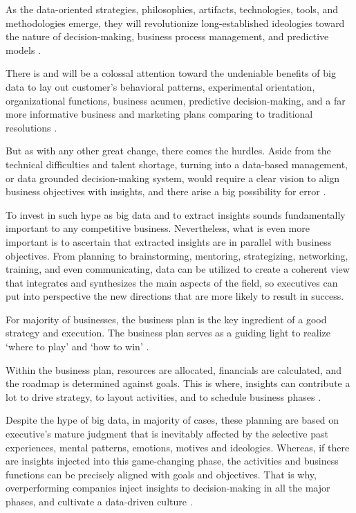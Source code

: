 As the data-oriented strategies, philosophies, artifacts, technologies, tools, and methodologies emerge, they will revolutionize long-established ideologies toward the nature of decision-making, business process management, and predictive models \cite{Popovic2018}.

There is and will be a colossal attention toward the undeniable benefits of big data to lay out customer’s behavioral patterns, experimental orientation, organizational functions, business acumen, predictive decision-making, and a far more informative business and marketing plans comparing to traditional resolutions \cite{Driest2016}.

But as with any other great change, there comes the hurdles. Aside from the technical difficulties and talent shortage, turning into a data-based management, or data grounded decision-making system, would require a clear vision to align business objectives with insights, and there arise a big possibility for error \cite{Ranjan2019}.

To invest in such hype as big data and to extract insights sounds fundamentally important to any competitive business. Nevertheless, what is even more important is to ascertain that extracted insights are in parallel with business objectives. From planning to brainstorming, mentoring, strategizing, networking, training, and even communicating, data can be utilized to create a coherent view that integrates and synthesizes the main aspects of the field, so executives can put into perspective the new directions that are more likely to result in success.

For majority of businesses, the business plan is the key ingredient of a good strategy and execution. The business plan serves as a guiding light to realize ‘where to play’ and ‘how to win’ \cite{Driest2016}.

Within the business plan, resources are allocated, financials are calculated, and the roadmap is determined against goals. This is where, insights can contribute a lot to drive strategy, to layout activities, and to schedule business phases \cite{Chen2018a}.

Despite the hype of big data, in majority of cases, these planning are based on executive’s mature judgment that is inevitably affected by the selective past experiences, mental patterns, emotions, motives and ideologies. Whereas, if there are insights injected into this game-changing phase, the activities and business functions can be precisely aligned with goals and objectives. That is why, overperforming companies inject insights to decision-making in all the major phases, and cultivate a data-driven culture \cite{Driest2016}.

